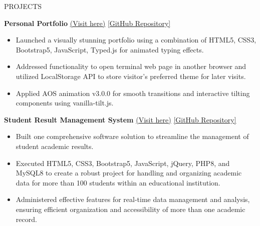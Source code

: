\documentclass{resume} %
\begin{document}
\begin{rSection}{PROJECTS}
    \vspace{-1.15em}
    
    \item \textbf{Personal Portfolio} {\href{https://arkapg211002.github.io/}{(Visit here)}} {\href{https://github.com/arkapg211002/arkapg211002.github.io}{[GitHub Repository]}}
    \vspace{-0.6em}
    \begin{itemize}
    \setlength\itemsep{-0.6em}
    \item Launched a visually stunning portfolio using a combination of HTML5, CSS3, Bootstrap5, JavaScript, Typed.js for animated typing effects.
    \item Addressed functionality to open terminal web page in another browser and utilized LocalStorage API to store visitor’s preferred theme for later visits.
    \item Applied AOS animation v3.0.0 for smooth transitions and interactive tilting components using vanilla-tilt.js.
    \end{itemize}

    \item \textbf{Student Result Management System} {\href{https://arkaphpcrud.000webhostapp.com/index.php}{(Visit here)}}
    {\href{https://github.com/arkapg211002/Student-Result-Management-System}{[GitHub Repository]}}
    \vspace{-0.6em}
    \begin{itemize}
    \setlength\itemsep{-0.6em}
     \item Built one comprehensive software solution to streamline the management of student academic results.
    \item Executed HTML5, CSS3, Bootstrap5, JavaScript, jQuery, PHP8, and MySQL8 to create a robust project for handling and organizing academic data for more than 100 students within an educational institution.
    \item Administered effective features for real-time data management and analysis, ensuring efficient organization and accessibility of more than one academic record.
    \end{itemize}


\end{rSection}
\end{document}
